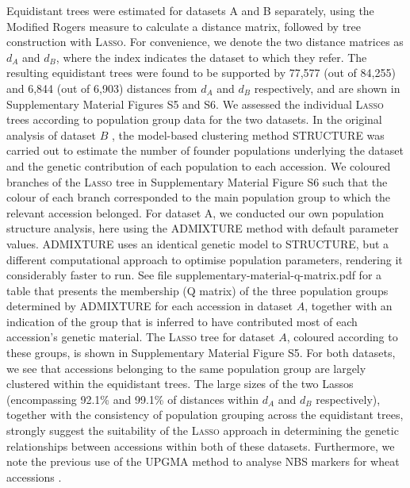 Equidistant trees were estimated for datasets A and B separately, using the
Modified Rogers measure \cite{reif} to calculate a distance matrix, followed
by tree construction with \textsc{Lasso}. For convenience, we denote the two
distance matrices as $d_A$ and $d_B$, where the index indicates the dataset to
which they refer. The resulting equidistant trees were found to be supported
by 77,577 (out of 84,255) and 6,844 (out of 6,903) distances from $d_A$ and
$d_B$ respectively, and are shown in Supplementary Material Figures S5 and S6.
We assessed the individual \textsc{Lasso} trees according to population group
data for the two datasets. In the original analysis of dataset $B$
\cite{muge}, the model-based clustering method STRUCTURE \cite{structure} was
carried out to estimate the number of founder populations underlying the
dataset and the genetic contribution of each population to each accession. We
coloured branches of the \textsc{Lasso} tree in Supplementary Material Figure
S6 such that the colour of each branch corresponded to the main population
group to which the relevant accession belonged.  For dataset A, we conducted
our own population structure analysis, here using the ADMIXTURE method
\cite{admixture} with default parameter values.  ADMIXTURE uses an identical
genetic model to STRUCTURE, but a different computational approach to optimise
population parameters, rendering it considerably faster to run.  See file
supplementary-material-q-matrix.pdf for a table that presents the membership
(Q matrix) of the three population groups determined by ADMIXTURE for each
accession in dataset $A$, together with an indication of the group that is
inferred to have contributed most of each accession's genetic material. The
\textsc{Lasso} tree for dataset $A$, coloured according to these groups, is
shown in Supplementary Material Figure S5. For both datasets, we see that
accessions belonging to the same population group are largely clustered within
the equidistant trees. The large sizes of the two Lassos (encompassing 92.1\%
and 99.1\% of distances within $d_A$ and $d_B$ respectively), together with
the consistency of population grouping across the equidistant trees, strongly
suggest the suitability of the \textsc{Lasso} approach in determining the
genetic relationships between accessions within both of these
datasets. Furthermore, we note the previous use of the \textsc{UPGMA} method
to analyse NBS markers for wheat accessions \cite{mantovani06nbs}.

